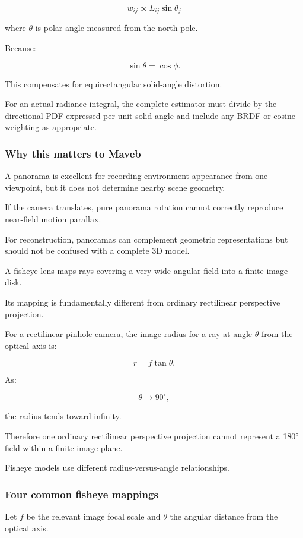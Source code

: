 \[ \boxed{ w_{ij}\propto L_{ij}\sin\theta_j } \]

where \(\theta\) is polar angle measured from the north pole.

Because:

\[ \sin\theta=\cos\phi. \]

This compensates for equirectangular solid-angle distortion.

For an actual radiance integral, the complete estimator must divide by the directional PDF expressed per unit solid angle and include any BRDF or cosine weighting as appropriate.

\subsubsection{Why this matters to Maveb}\label{why-this-matters-to-maveb}

A panorama is excellent for recording environment appearance from one viewpoint, but it does not determine nearby scene geometry.

If the camera translates, pure panorama rotation cannot correctly reproduce near-field motion parallax.

For reconstruction, panoramas can complement geometric representations but should not be confused with a complete 3D model.

A fisheye lens maps rays covering a very wide angular field into a finite image disk.

Its mapping is fundamentally different from ordinary rectilinear perspective projection.

For a rectilinear pinhole camera, the image radius for a ray at angle \(\theta\) from the optical axis is:

\[ \boxed{ r=f\tan\theta. } \]

As:

\[ \theta\to90^\circ, \]

the radius tends toward infinity.

Therefore one ordinary rectilinear perspective projection cannot represent a 180° field within a finite image plane.

Fisheye models use different radius-versus-angle relationships.

\subsubsection{Four common fisheye mappings}\label{four-common-fisheye-mappings}

Let \(f\) be the relevant image focal scale and \(\theta\) the angular distance from the optical axis.

